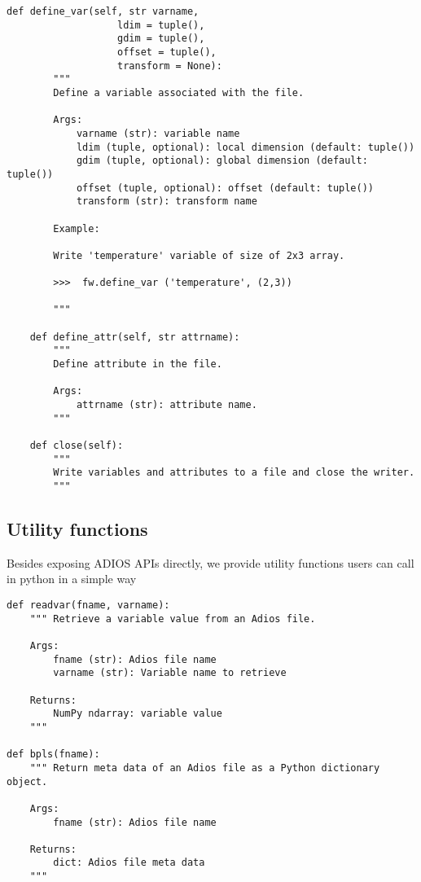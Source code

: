 \begin{lstlisting}[language=cython,caption={Writer functions},label={},]
    def define_var(self, str varname,
                   ldim = tuple(),
                   gdim = tuple(),
                   offset = tuple(),
                   transform = None):
        """
        Define a variable associated with the file.

        Args:
            varname (str): variable name
            ldim (tuple, optional): local dimension (default: tuple())
            gdim (tuple, optional): global dimension (default: tuple())
            offset (tuple, optional): offset (default: tuple())
            transform (str): transform name

        Example:

        Write 'temperature' variable of size of 2x3 array.

        >>>  fw.define_var ('temperature', (2,3))

        """

    def define_attr(self, str attrname):
        """
        Define attribute in the file.

        Args:
            attrname (str): attribute name.
        """

    def close(self):
        """
        Write variables and attributes to a file and close the writer.
        """

\end{lstlisting}

\subsection{Utility functions}
Besides exposing ADIOS APIs directly, we provide utility functions users can call in python in a simple way

\begin{lstlisting}[language=cython,caption={Utility functions},label={},]
def readvar(fname, varname):
    """ Retrieve a variable value from an Adios file.

    Args:
        fname (str): Adios file name
        varname (str): Variable name to retrieve

    Returns:
        NumPy ndarray: variable value
    """

def bpls(fname):
    """ Return meta data of an Adios file as a Python dictionary object.

    Args:
        fname (str): Adios file name

    Returns:
        dict: Adios file meta data
    """
\end{lstlisting}

